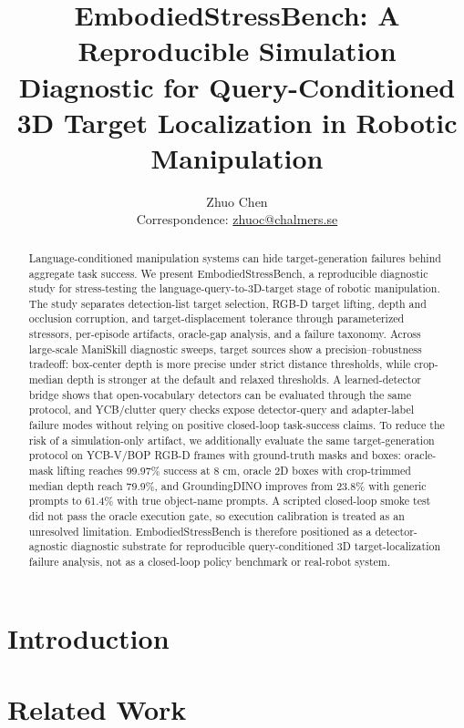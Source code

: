 \documentclass[10pt]{article}
\title{EmbodiedStressBench: A Reproducible Simulation Diagnostic for Query-Conditioned 3D Target Localization in Robotic Manipulation}
\author{Zhuo Chen\\Correspondence: \href{mailto:zhuoc@chalmers.se}{zhuoc@chalmers.se}}
\date{}
\begin{document}
\maketitle

\begin{abstract}
Language-conditioned manipulation systems can hide target-generation failures behind aggregate task success. We present EmbodiedStressBench, a reproducible diagnostic study for stress-testing the language-query-to-3D-target stage of robotic manipulation. The study separates detection-list target selection, RGB-D target lifting, depth and occlusion corruption, and target-displacement tolerance through parameterized stressors, per-episode artifacts, oracle-gap analysis, and a failure taxonomy. Across large-scale ManiSkill diagnostic sweeps, target sources show a precision--robustness tradeoff: box-center depth is more precise under strict distance thresholds, while crop-median depth is stronger at the default and relaxed thresholds. A learned-detector bridge shows that open-vocabulary detectors can be evaluated through the same protocol, and YCB/clutter query checks expose detector-query and adapter-label failure modes without relying on positive closed-loop task-success claims. To reduce the risk of a simulation-only artifact, we additionally evaluate the same target-generation protocol on YCB-V/BOP RGB-D frames with ground-truth masks and boxes: oracle-mask lifting reaches 99.97\% success at 8 cm, oracle 2D boxes with crop-trimmed median depth reach 79.9\%, and GroundingDINO improves from 23.8\% with generic prompts to 61.4\% with true object-name prompts. A scripted closed-loop smoke test did not pass the oracle execution gate, so execution calibration is treated as an unresolved limitation. EmbodiedStressBench is therefore positioned as a detector-agnostic diagnostic substrate for reproducible query-conditioned 3D target-localization failure analysis, not as a closed-loop policy benchmark or real-robot system.
\end{abstract}

\section{Introduction}


\section{Related Work}

\end{document}
